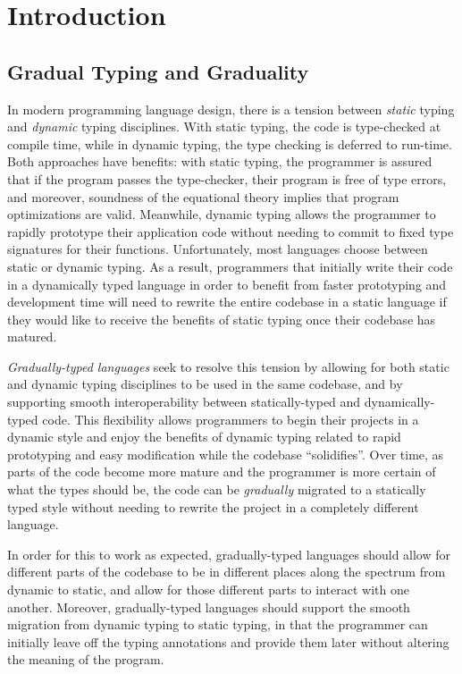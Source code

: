 \section{Introduction}
  
\subsection{Gradual Typing and Graduality}
In modern programming language design, there is a tension between \emph{static} typing
and \emph{dynamic} typing disciplines.
With static typing, the code is type-checked at compile time, while in dynamic typing,
the type checking is deferred to run-time. Both approaches have benefits: with static 
typing, the programmer is assured that if the program passes the type-checker, their
program is free of type errors, and moreover, soundness of the equational theory implies
that program optimizations are valid.
Meanwhile, dynamic typing allows the programmer to rapidly prototype
their application code without needing to commit to fixed type signatures for their
functions. Unfortunately, most languages choose between static or dynamic typing.
As a result, programmers that initially write their code in a dynamically typed language
in order to benefit from faster prototyping and development time will need to rewrite the
entire codebase in a static language if they would like to receive the benefits of static
typing once their codebase has matured.

\emph{Gradually-typed languages} \cite{siek-taha06, tobin-hochstadt06} seek to resolve this tension
by allowing for both static and dynamic typing disciplines to be used in the same codebase,
and by supporting smooth interoperability between statically-typed and dynamically-typed code.
This flexibility allows programmers to begin their projects in a dynamic style and
enjoy the benefits of dynamic typing related to rapid prototyping and easy modification
while the codebase ``solidifies''. Over time, as parts of the code become more mature
and the programmer is more certain of what the types should be, the code can be
\emph{gradually} migrated to a statically typed style without needing to
rewrite the project in a completely different language.


In order for this to work as expected, gradually-typed languages should allow for
different parts of the codebase to be in different places along the spectrum from
dynamic to static, and allow for those different parts to interact with one another.
Moreover, gradually-typed languages should support the smooth migration from
dynamic typing to static typing, in that the programmer can initially leave off the
typing annotations and provide them later without altering the meaning of the program.

